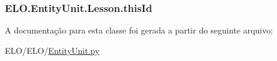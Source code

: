 \hypertarget{classELO_1_1EntityUnit_1_1Lesson_a2ec9bd43b6b7ac7c7d00469c9f586271}{
\subsubsection[{this\-Id}]{\setlength{\rightskip}{0pt plus 5cm}E\-L\-O.\-Entity\-Unit.\-Lesson.\-this\-Id}}\label{classELO_1_1EntityUnit_1_1Lesson_a2ec9bd43b6b7ac7c7d00469c9f586271}


A documentação para esta classe foi gerada a partir do seguinte arquivo\-:\begin{DoxyCompactItemize}
\item 
E\-L\-O/\-E\-L\-O/\hyperlink{EntityUnit_8py}{Entity\-Unit.\-py}\end{DoxyCompactItemize}
